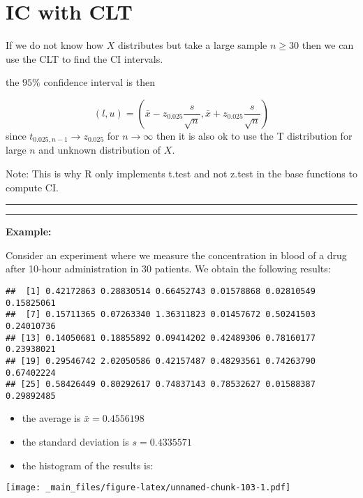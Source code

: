 \documentclass[
]{book}
\begin{document}
\hypertarget{ic-with-clt}{%
\section{IC with CLT}\label{ic-with-clt}}

If we do not know how \(X\) distributes but take a large sample \(n\ge 30\) then we can use the CLT to find the CI intervals.

the \(95\%\) confidence interval is then

\[(l,u)=(\bar{x}-z_{0.025} \frac{s}{\sqrt{n}}, \bar{x}+z_{0.025} \frac{s}{\sqrt{n}})\]
since \(t_{0.025, n-1} \rightarrow z_{0.025}\) for \(n \rightarrow \infty\) then it is also ok to use the T distribution for large \(n\) and unknown distribution of \(X\).

Note: This is why R only implements t.test and not z.test in the base functions to compute CI.

\begin{center}\rule{0.5\linewidth}{0.5pt}\end{center}

\begin{center}\rule{0.5\linewidth}{0.5pt}\end{center}

\textbf{Example:}

Consider an experiment where we measure the concentration in blood of a drug after 10-hour administration in \(30\) patients. We obtain the following results:

\begin{verbatim}
##  [1] 0.42172863 0.28830514 0.66452743 0.01578868 0.02810549 0.15825061
##  [7] 0.15711365 0.07263340 1.36311823 0.01457672 0.50241503 0.24010736
## [13] 0.14050681 0.18855892 0.09414202 0.42489306 0.78160177 0.23938021
## [19] 0.29546742 2.02050586 0.42157487 0.48293561 0.74263790 0.67402224
## [25] 0.58426449 0.80292617 0.74837143 0.78532627 0.01588387 0.29892485
\end{verbatim}

\begin{itemize}
\item
  the average is \(\bar{x}=0.4556198\)
\item
  the standard deviation is \(s=0.4335571\)
\item
  the histogram of the results is:
\end{itemize}

\texttt{[image: \_main\_files/figure-latex/unnamed-chunk-103-1.pdf]}
\end{document}
